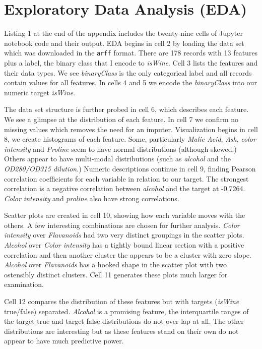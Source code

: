 \documentclass[11pt,letterpaper]{article}
\begin{document}
\section{Exploratory Data Analysis (EDA)}
\tab Listing 1 at the end of the appendix includes the twenty-nine cells of Jupyter notebook code and their output. EDA begins in cell 2 by loading the data set which was downloaded in the \texttt{arff} format. There are 178 records with 13 features plus a label, the binary class that I encode to \emph{isWine}. Cell 3 lists the features and their data types. We see \emph{binaryClass} is the only categorical label and all records contain values for all features. In cells 4 and 5 we encode the \emph{binaryClass} into our numeric target \emph{isWine}.

The data set structure is further probed in cell 6, which describes each feature. We see a glimpse at the distribution of each feature. In cell 7 we confirm no missing values which removes the need for an imputer. Visualization begins in cell 8, we create histograms of each feature. Some, particularly \emph{Malic Acid}, \emph{Ash}, \emph{color intensity} and \emph{Proline} seem to have normal distributions (although skewed.) Others appear to have multi-modal distributions (such as \emph{alcohol} and the \emph{OD280/OD315 dilution}.) Numeric descriptions continue in cell 9, finding Pearson correlation coefficients for each variable in relation to our target. The strongest correlation is a negative correlation between \emph{alcohol} and the target at -0.7264. \emph{Color intensity} and \emph{proline} also have strong correlations.

Scatter plots are created in cell 10, showing how each variable moves with the others. A few interesting combinations are chosen for further analysis. \emph{Color intensity} over \emph{Flavanoids} had two very distinct groupings in the scatter plots. \emph{Alcohol} over \emph{Color intensity} has a tightly bound linear section with a positive correlation and then another cluster the appears to be a cluster with zero slope. \emph{Alcohol} over \emph{Flavanoids} has a hooked shape in the scatter plot with two ostensibly distinct clusters. Cell 11 generates these plots much larger for examination.

Cell 12 compares the distribution of these features but with targets (\emph{isWine} true/false) separated. \emph{Alcohol} is a promising feature, the interquartile ranges of the target true and target false distributions do not over lap at all. The other distributions are interesting but as these features stand on their own do not appear to have much predictive power.
\end{document}
